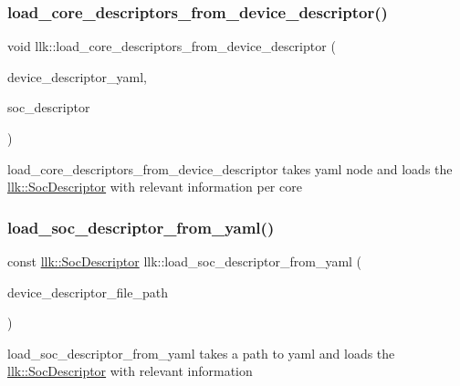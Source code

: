 \mbox{\label{namespacellk_aba61403c3cbb47767fd66634401ca1ad}} 
\subsubsection{\texorpdfstring{load\+\_\+core\+\_\+descriptors\+\_\+from\+\_\+device\+\_\+descriptor()}{load\_core\_descriptors\_from\_device\_descriptor()}}
{\footnotesize\ttfamily void llk\+::load\+\_\+core\+\_\+descriptors\+\_\+from\+\_\+device\+\_\+descriptor (\begin{DoxyParamCaption}\item[{Y\+A\+M\+L\+::\+Node}]{device\+\_\+descriptor\+\_\+yaml,  }\item[{\hyperlink{structllk_1_1SocDescriptor}{llk\+::\+Soc\+Descriptor} \&}]{soc\+\_\+descriptor }\end{DoxyParamCaption})}

load\+\_\+core\+\_\+descriptors\+\_\+from\+\_\+device\+\_\+descriptor takes yaml node and loads the \hyperlink{structllk_1_1SocDescriptor}{llk\+::\+Soc\+Descriptor} with relevant information per core \mbox{\label{namespacellk_af288472eef4153c0c2592b87940d7e9a}} 
\subsubsection{\texorpdfstring{load\+\_\+soc\+\_\+descriptor\+\_\+from\+\_\+yaml()}{load\_soc\_descriptor\_from\_yaml()}}
{\footnotesize\ttfamily const \hyperlink{structllk_1_1SocDescriptor}{llk\+::\+Soc\+Descriptor} llk\+::load\+\_\+soc\+\_\+descriptor\+\_\+from\+\_\+yaml (\begin{DoxyParamCaption}\item[{std\+::string}]{device\+\_\+descriptor\+\_\+file\+\_\+path }\end{DoxyParamCaption})}



load\+\_\+soc\+\_\+descriptor\+\_\+from\+\_\+yaml takes a path to yaml and loads the \hyperlink{structllk_1_1SocDescriptor}{llk\+::\+Soc\+Descriptor} with relevant information 



